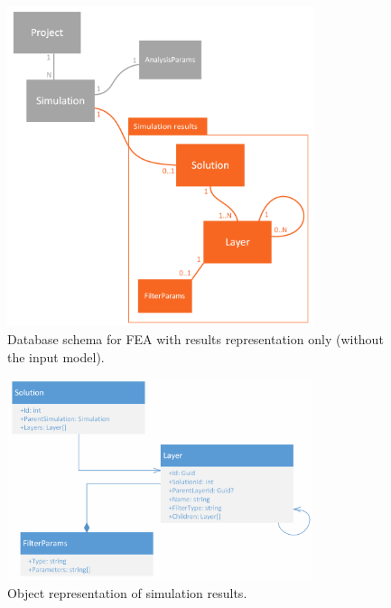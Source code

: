 \begin{figure}[H]
    \centering
    \includegraphics[width=0.8\textwidth]{figures/chapter-data-management/FEA-database-schema-only-results}
    \decoRule
    \caption[Database schema for FEA with results representation only]{Database schema for FEA with results representation only (without the input model).}
    \label{fig:FEA-db-schema-results}
\end{figure}

\begin{figure}[H]
    \centering
    \includegraphics[width=0.8\textwidth]{figures/chapter-data-management/results-class-diagram}
    \decoRule
    \caption{Object representation of simulation results.}
    \label{fig:results-class-diagram}
\end{figure}

